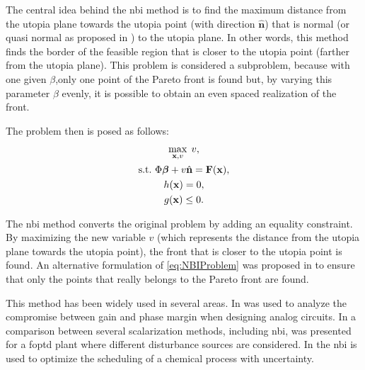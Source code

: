 The central idea behind the \gls{nbi} method is to find the maximum distance from the utopia plane towards the utopia point (with direction $\hat{\mathbf{n}}$) that is normal (or quasi normal as proposed in \cite{Das1998}) to the utopia plane. In other words, this method finds the border of the feasible region that is closer to the utopia point (farther from the utopia plane). This problem is considered a subproblem, because with one given $\beta$,only one point of the Pareto front is found but, by varying this parameter $\beta$ evenly, it is possible to obtain an even spaced realization of the front.

The problem then is posed as follows:%
%
\begin{equation}
\begin{gathered}
\max_{\mathbf{x},v}{\;v}, \\
\text{s.t.} \ \Phi \boldsymbol{\beta} + v \hat{\mathbf{n}} = \mathbf{F}(\mathbf{x}),\\
h(\mathbf{x})=0, \\
g(\mathbf{x}) \leq 0.
\end{gathered}
\label{eq:NBIProblem}
\end{equation}%

The \gls{nbi} method converts the original problem by adding an equality constraint. By maximizing the new variable $v$ (which represents the distance from the utopia plane towards the utopia point), the front that is closer to the utopia point is found. An alternative formulation of \eqref{eq:NBIProblem} was proposed in \cite{Shukla2007} to ensure that only the points that really belongs to the Pareto front are found.

This method has been widely used in several areas. In \cite{Stehr2003} was used to analyze the compromise between gain and phase margin when designing analog circuits. In \cite{Rojas2015b} a comparison between several scalarization methods, including \gls{nbi}, was presented for a \gls{foptd} plant where different disturbance sources are considered. In \cite{Ierapetritou2007a} the \gls{nbi} is used to optimize the scheduling of a chemical process with uncertainty.
